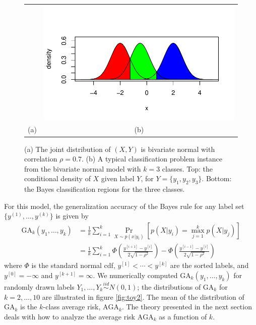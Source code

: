 \documentclass[twoside,11pt]{article}
\begin{document}
\begin{figure}[h]
\begin{tabular}{cc}
 &  \includegraphics[scale = 0.5, clip = true, trim = 0 0 0 0.5in]{illus_example1b.pdf}\\
(a) & (b)
\end{tabular}

\caption{
(a) The joint distribution of $(X, Y)$ is bivariate normal with correlation $\rho = 0.7$.
(b) A typical classification problem instance from the bivariate normal model with $k = 3$ classes.
Top: the conditional density of $X$ given label $Y$, for $Y = \{y_1, y_2, y_3\}$.
Bottom: the Bayes classification regions for the three classes.}\label{fig:toy1}
\end{figure}

For this model, the generalization accuracy of the Bayes rule for any label set $\{y^{(1)},\hdots, y^{(k)}\}$ is given by
\begin{align*}
\text{GA}_k(y_1,\hdots, y_k) &= \frac{1}{k}\sum_{i=1}^k \Pr_{X \sim p(x|y_i)}[p(X|y_i) = \max_{j=1}^k p(X|y_j)]
\\&= \frac{1}{k}\sum_{i=1}^k \Phi\left(\frac{y^{[i+1]} - y^{[i]}}{2\sqrt{1-\rho^2}}\right) - \Phi\left(\frac{y^{[i-1]} - y^{[i]}}{2\sqrt{1-\rho^2}}\right)
\end{align*}
where $\Phi$ is the standard normal cdf, $y^{[1]} < \cdots < y^{[k]}$ are the sorted labels, and $y^{[0]} = -\infty$ and $y^{[k+1]} = \infty$.
We numerically computed $\text{GA}_k(y_1,\hdots, y_k)$ for randomly
drawn labels $Y_1,\hdots, Y_k \stackrel{iid}{\sim} N(0, 1)$; the
distributions of $\text{GA}_k$ for $k = 2,\hdots, 10$
are illustrated in figure \ref{fig:toy2}.  The mean of the distribution of $\text{GA}_k$ is the $k$-class average risk,
$\text{AGA}_k$. The theory
presented in the next section deals with how to analyze the
average risk $\text{AGA}_k$ as a function of $k$. 
\end{document}
